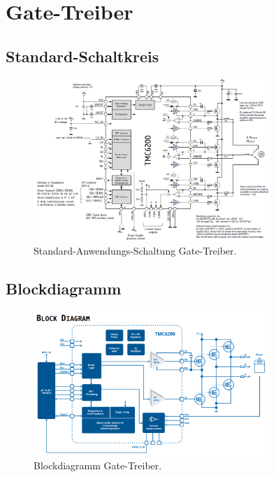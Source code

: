 \section{Gate-Treiber}\label{Appendix:TMC6200}

\subsection{Standard-Schaltkreis}\label{Appendix:Schaltung_TMC6200}

\begin{figure}[H]
	\centering
	\includegraphics[width=0.8\textwidth]{graphics/Standard_Application_Cirquit_TMC6200.png}
	\caption{Standard-Anwendungs-Schaltung Gate-Treiber.\cite[S.1]{trinamicmotion_control_gmbh__co_kg_tmc6200_2019}}
	\label{fig:Schaltung_TMC6200}
\end{figure}

\subsection{Blockdiagramm}\label{Appendix:Blockdiagramm_TMC6200}

\begin{figure}[H]
	\centering
	\includegraphics[width=0.8\textwidth]{graphics/Blockdiagramm_TMC6200.png}
	\caption{Blockdiagramm Gate-Treiber.\cite[S.5]{trinamicmotion_control_gmbh__co_kg_tmc6200_2019}}
	\label{fig:Blockdiagramm_TMC6200}
\end{figure}

